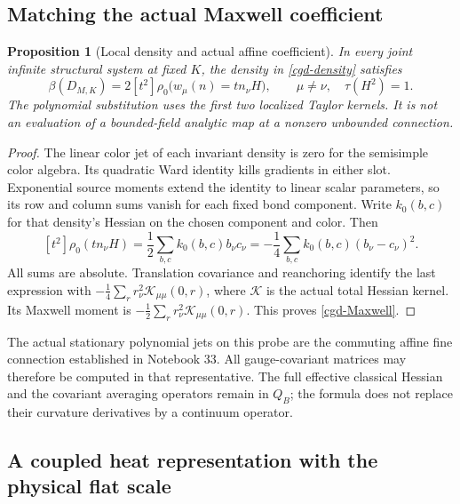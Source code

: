 \documentclass[11pt]{article}
\newtheorem{proposition}[theorem]{Proposition}
\theoremstyle{remark}
\begin{document}
\subsection{Matching the actual Maxwell coefficient}
\label{cgd-Maxwell-section}

\begin{proposition}[Local density and actual affine coefficient]
\label{cgd-density-theorem}
In every joint infinite structural system at fixed \(K\),
the density in \eqref{cgd-density} satisfies
\begin{equation}
 \beta(D_{M,K})=
    2[t^2]\rho_0\bigl(w_\mu(n)=t n_\nu H\bigr),
 \qquad \mu\ne\nu,\quad\tau(H^2)=1.
 \label{cgd-Maxwell}
\end{equation}
The polynomial substitution uses the first two localized
Taylor kernels. It is not an evaluation of a bounded-field
analytic map at a nonzero unbounded connection.
\end{proposition}

\begin{proof}
The linear color jet of each invariant density is zero
for the semisimple color algebra. Its quadratic Ward
identity kills gradients in either slot. Exponential
source moments extend the identity to linear scalar
parameters, so its row and column sums vanish for
each fixed bond component. Write \(k_0(b,c)\) for that
density's Hessian on the chosen component and color.
Then
\[
 [t^2]\rho_0(t n_\nu H)
   =\frac12\sum_{b,c}k_0(b,c)b_\nu c_\nu
   =-\frac14\sum_{b,c}k_0(b,c)(b_\nu-c_\nu)^2.
\]
All sums are absolute. Translation covariance and
reanchoring identify the last expression with
\(-\frac14\sum_r r_\nu^2\mathcal K_{\mu\mu}(0,r)\),
where \(\mathcal K\) is the actual total Hessian
kernel. Its Maxwell moment is
\(-\frac12\sum_r r_\nu^2\mathcal K_{\mu\mu}(0,r)\).
This proves \eqref{cgd-Maxwell}.
\end{proof}

The actual stationary polynomial jets on this probe
are the commuting affine fine connection established
in Notebook 33. All gauge-covariant matrices may
therefore be computed in that representative.
The full effective classical Hessian and the
covariant averaging operators remain in \(Q_B\);
the formula does not replace their curvature
derivatives by a continuum operator.

\subsection{A coupled heat representation with the physical flat scale}
\label{cgd-heat-section}
\end{document}
